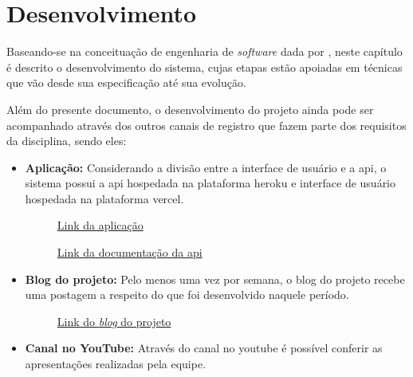 \chapter{Desenvolvimento}
Baseando-se na conceituação de engenharia de \textsl{software} dada por , neste capítulo é descrito o desenvolvimento do sistema, cujas etapas estão apoiadas em técnicas que vão desde sua especificação até sua evolução.

Além do presente documento, o desenvolvimento do projeto ainda pode ser acompanhado através dos outros canais de registro que fazem parte dos requisitos da disciplina, sendo eles:

\begin{itemize}
    \item \textbf{Aplicação:} Considerando a divisão entre a interface de usuário e a \acs{api}, o sistema possui a \acs{api} hospedada na plataforma \gls{heroku} e interface de usuário hospedada na plataforma \gls{vercel}.
    \begin{figure}[htb]
    \centering
    \caption{\href{https://ifriends.vercel.app}{Link da aplicação}}
    \end{figure}
    \FloatBarrier
    \begin{figure}[htb]
    \centering
    \caption{\href{https://ifriends-api.herokuapp.com/swagger-ui/index.html}{Link da documentação da \acs{api}}}
    \end{figure}
    \FloatBarrier
    \item \textbf{Blog do projeto:} Pelo menos uma vez por semana, o blog do projeto recebe uma postagem a respeito do que foi desenvolvido naquele período. 
    
    \begin{figure}[htb]
    \centering
    \caption{\href{https://bunkabytes.blogspot.com}{Link do \textit{blog} do projeto}}
    \end{figure}
    \FloatBarrier
    \item \textbf{Canal no YouTube:} Através do canal no \gls{youtube} é possível conferir as apresentações realizadas pela equipe.
    

\end{itemize}
